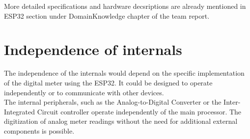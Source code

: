 More detailed specifications and hardware decsriptions are already mentioned in ESP32 section under DomainKnowledge chapter of the team report.

\section{Independence of internals}
The independence of the internals would depend on the specific implementation of the digital meter using the ESP32. It could be designed to operate independently or to communicate with other devices.\\

The internal peripherals, such as the Analog-to-Digital Converter or the Inter-Integrated Circuit controller operate independently of the main processor. The digitization of analog meter readings without the need for additional external components is possible.